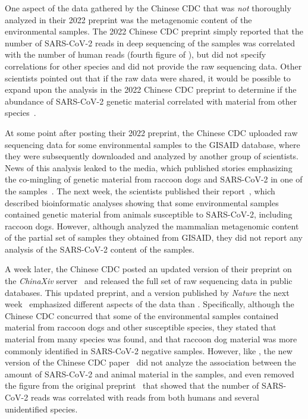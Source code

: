 \documentclass[9pt,twocolumn,twoside]{gsajnl_modified}
\begin{document}
One aspect of the data gathered by the Chinese CDC that was \emph{not} thoroughly analyzed in their 2022 preprint was the metagenomic content of the environmental samples. 
The 2022 Chinese CDC preprint simply reported that the number of SARS-CoV-2 reads in deep sequencing of the samples was correlated with the number of human reads (fourth figure of \citet{liu2022surveillance}), but did not specify correlations for other species and did not provide the raw sequencing data.
Other scientists pointed out that if the raw data were shared, it would be possible to expand upon the analysis in the 2022 Chinese CDC preprint to determine if the abundance of SARS-CoV-2 genetic material correlated with material from other species~\citep{cohen2022anywhere,cohen2022studies}.

At some point after posting their 2022 preprint, the Chinese CDC uploaded raw sequencing data for some environmental samples to the GISAID database, where they were subsequently downloaded and analyzed by another group of scientists.
News of this analysis leaked to the media, which published stories emphasizing the co-mingling of genetic material from raccoon dogs and SARS-CoV-2 in one of the samples~\citep{wu2023atlantic,mueller2023nytimes}.
The next week, the scientists published their report~\citep{crits2023genetic}, which described bioinformatic analyses showing that some environmental samples contained genetic material from animals susceptible to SARS-CoV-2, including raccoon dogs.
However, although \citet{crits2023genetic} analyzed the mammalian metagenomic content of the partial set of samples they obtained from GISAID, they did not report any analysis of the SARS-CoV-2 content of the samples.

A week later, the Chinese CDC posted an updated version of their preprint on the \textit{ChinaXiv} server~\citep{liu2023surveillance-chinaxiv} and released the full set of raw sequencing data in public databases.
This updated preprint, and a version published by \textit{Nature} the next week~\citep{liu2023surveillance} emphasized different aspects of the data than \citet{crits2023genetic}.
Specifically, although the Chinese CDC concurred that some of the environmental samples contained material from raccoon dogs and other susceptible species, they stated that material from many species was found, and that raccoon dog material was more commonly identified in SARS-CoV-2 negative samples.
However, like \citet{crits2023genetic}, the new version of the Chinese CDC paper~\citep{liu2023surveillance} did not analyze the association between the amount of SARS-CoV-2 and animal material in the samples, and even removed the figure from the original preprint~\citep{liu2022surveillance} that showed that the number of SARS-CoV-2 reads was correlated with reads from both humans and several unidentified species.
\end{document}
